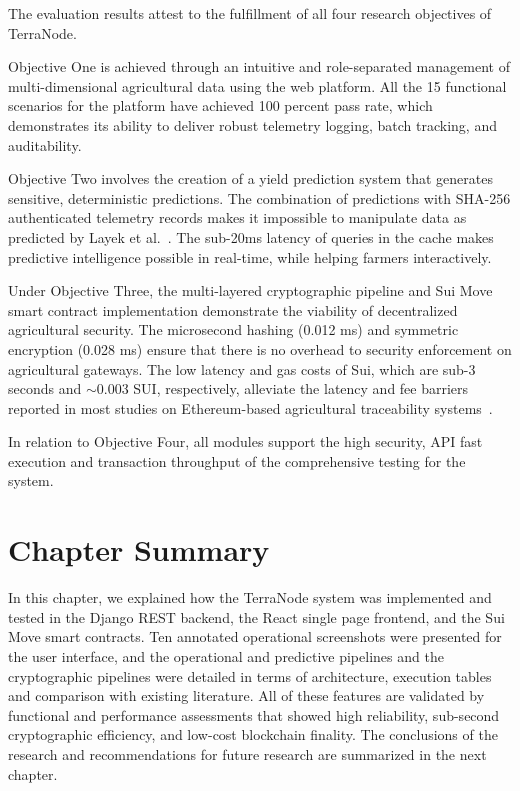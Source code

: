 The evaluation results attest to the fulfillment of all four research objectives of TerraNode. 

Objective One is achieved through an intuitive and role-separated management of multi-dimensional agricultural data using the web platform. All the 15 functional scenarios for the platform have achieved 100 percent pass rate, which demonstrates its ability to deliver robust telemetry logging, batch tracking, and auditability.

Objective Two involves the creation of a yield prediction system that generates sensitive, deterministic predictions. The combination of predictions with SHA-256 authenticated telemetry records makes it impossible to manipulate data as predicted by Layek et al.~\parencite{layek2025secured}. The sub-20ms latency of queries in the cache makes predictive intelligence possible in real-time, while helping farmers interactively.

Under Objective Three, the multi-layered cryptographic pipeline and Sui Move smart contract implementation demonstrate the viability of decentralized agricultural security. The microsecond hashing (0.012 ms) and symmetric encryption (0.028 ms) ensure that there is no overhead to security enforcement on agricultural gateways. The low latency and gas costs of Sui, which are sub-3 seconds and $\sim$0.003 SUI, respectively, alleviate the latency and fee barriers reported in most studies on Ethereum-based agricultural traceability systems~\parencite{caro2018blockchain}.

In relation to Objective Four, all modules support the high security, API fast execution and transaction throughput of the comprehensive testing for the system.

\section{Chapter Summary}
\label{sec:ch4_conclusion}

In this chapter, we explained how the TerraNode system was implemented and tested in the Django REST backend, the React single page frontend, and the Sui Move smart contracts. Ten annotated operational screenshots were presented for the user interface, and the operational and predictive pipelines and the cryptographic pipelines were detailed in terms of architecture, execution tables and comparison with existing literature. All of these features are validated by functional and performance assessments that showed high reliability, sub-second cryptographic efficiency, and low-cost blockchain finality. The conclusions of the research and recommendations for future research are summarized in the next chapter.
